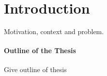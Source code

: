\chapter*{Introduction}

Motivation, context and problem.




\subsubsection*{Outline of the Thesis}
Give outline of thesis %
